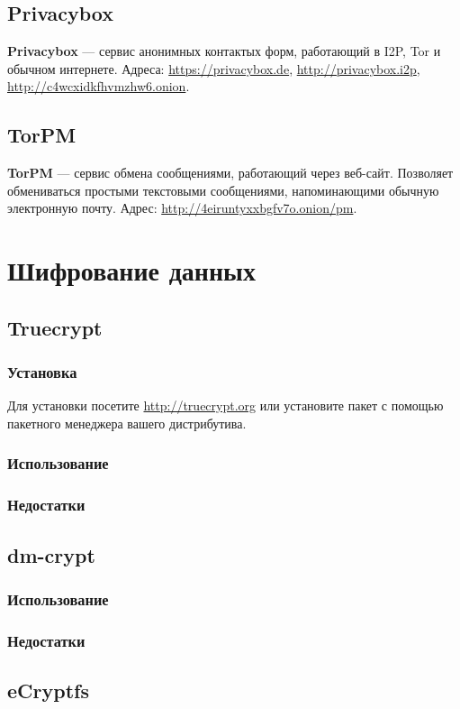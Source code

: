 \subsection{Privacybox}
\textbf{Privacybox} --- сервис анонимных контактых форм, работающий в I2P, Tor и обычном интернете. Адреса: \url{https://privacybox.de}, \url{http://privacybox.i2p}, \url{http://c4wcxidkfhvmzhw6.onion}.
\subsection{TorPM}
\textbf{TorPM} --- сервис обмена сообщениями, работающий через веб-сайт. Позволяет обмениваться простыми текстовыми сообщениями, напоминающими обычную электронную почту. Адрес: \url{http://4eiruntyxxbgfv7o.onion/pm}.

\section{Шифрование данных}
\subsection{Truecrypt}
\subsubsection{Установка}
Для установки посетите \url{http://truecrypt.org} или установите пакет с помощью пакетного менеджера вашего дистрибутива.
\subsubsection{Использование}
\subsubsection{Недостатки}
\subsection{dm-crypt}
\subsubsection{Использование}
\subsubsection{Недостатки}
\subsection{eCryptfs}

